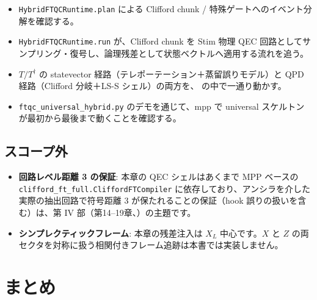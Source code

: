 \begin{itemize}
  \item \texttt{HybridFTQCRuntime.plan} による Clifford chunk / 特殊ゲートへのイベント分解を確認する。
  \item \texttt{HybridFTQCRuntime.run} が、Clifford chunk を Stim 物理 QEC 回路としてサンプリング・復号し、論理残差として状態ベクトルへ適用する流れを追う。
  \item $T/T^\dagger$ の statevector 経路（テレポーテーション＋蒸留誤りモデル）と QPD 経路（Clifford 分岐＋LS-S シェル）の両方を、 の中で一通り動かす。
  \item \texttt{ftqc\_universal\_hybrid.py} のデモを通じて、mpp で universal スケルトンが最初から最後まで動くことを確認する。
\end{itemize}

\subsection{スコープ外}

\begin{itemize}
  \item \textbf{回路レベル距離 3 の保証}: 本章の QEC シェルはあくまで MPP ベースの \texttt{clifford\_ft\_full.CliffordFTCompiler} に依存しており、アンシラを介した実際の抽出回路で符号距離 3 が保たれることの保証（hook 誤りの扱いを含む）は、第 IV 部（第14--19章、）の主題です。
  \item \textbf{シンプレクティックフレーム}: 本章の残差注入は $X_L$ 中心です。$X$ と $Z$ の両セクタを対称に扱う相関付きフレーム追跡は本書では実装しません。
\end{itemize}

\section{まとめ}\label{ch13:summary}

